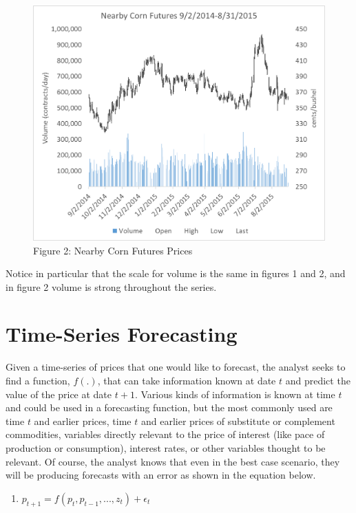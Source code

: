 \documentclass[]{book}
\providecommand{\tightlist}{%
  \setlength{\itemsep}{0pt}\setlength{\parskip}{0pt}}
\theoremstyle{definition}
\theoremstyle{definition}
\theoremstyle{remark}
\begin{document}
\begin{figure}[htbp]
\centering
\includegraphics{Excel-files/IntroductiontoCommodityTS-Nearby_construct_files/image001.png}
\caption{Figure 2: Nearby Corn Futures Prices}
\end{figure}

Notice in particular that the scale for volume is the same in figures 1
and 2, and in figure 2 volume is strong throughout the series.

\section{Time-Series Forecasting}\label{time-series-forecasting}

Given a time-series of prices that one would like to forecast, the
analyst seeks to find a function, \(f(.)\), that can take information
known at date \(t\) and predict the value of the price at date \(t+1\).
Various kinds of information is known at time \(t\) and could be used in
a forecasting function, but the most commonly used are time \(t\) and
earlier prices, time \(t\) and earlier prices of substitute or
complement commodities, variables directly relevant to the price of
interest (like pace of production or consumption), interest rates, or
other variables thought to be relevant. Of course, the analyst knows
that even in the best case scenario, they will be producing forecasts
with an error as shown in the equation below.

\begin{enumerate}
\def\labelenumi{(\arabic{enumi})}
\tightlist
\item
  \(p_{t+1} = f(p_t, p_{t-1}, ..., z_t) + \epsilon_t\)
\end{enumerate}
\end{document}
